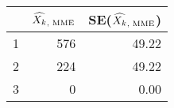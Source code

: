 \begin{table}[ht]
\centering
\begin{tabular}{rrr}
  \hline
 & $\widehat{X_k}_\text{, MME}$ & SE($\widehat{X_k}_\text{, MME}$) \\ 
  \hline
1 & 576 & 49.22 \\ 
  2 & 224 & 49.22 \\ 
  3 & 0 & 0.00 \\ 
   \hline
\end{tabular}
\end{table}
